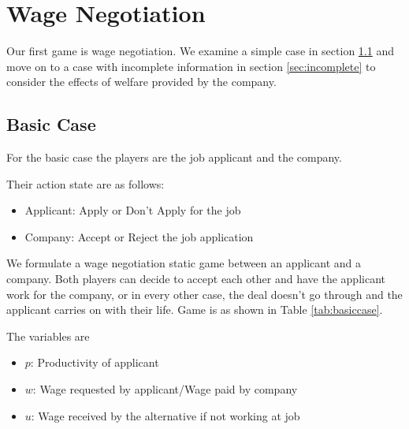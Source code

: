 \documentclass[a4paper, 12pt]{article}
\begin{document}



\section{Wage Negotiation}

Our first game is wage negotiation. We examine a simple case in section \ref{sec:basic} and move on to a case with incomplete information in section \ref{sec:incomplete} to consider the effects of welfare provided by the company.

\subsection{Basic Case}\label{sec:basic}

For the basic case the players are the job applicant and the company.

Their action state are as follows:
\begin{itemize}[noitemsep]
    \item Applicant: Apply or Don't Apply for the job
    \item Company: Accept or Reject the job application
\end{itemize}

We formulate a wage negotiation static game between an applicant and a company. Both players can decide to accept each other and have the applicant work for the company, or in every other case, the deal doesn't go through and the applicant carries on with their life. Game is as shown in Table \ref{tab:basiccase}.

The variables are
\begin{itemize}[noitemsep]
    \item $p$: Productivity of applicant
    \item $w$: Wage requested by applicant/Wage paid by company
    \item $u$: Wage received by the alternative if not working at job
\end{itemize}
\end{document}
